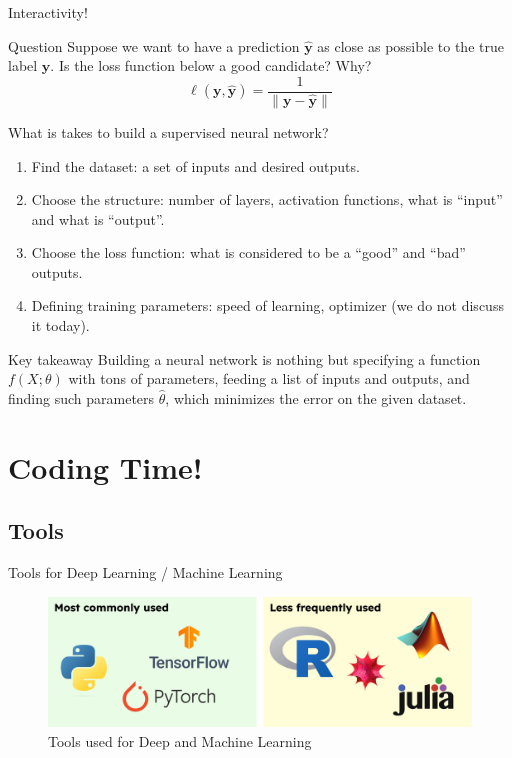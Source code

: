 \documentclass{beamer}
\begin{document}
    \begin{frame}{Interactivity!}
        \begin{block}{Question}
            Suppose we want to have a prediction $\hat{\boldsymbol{y}}$ as close as possible to the true label $\boldsymbol{y}$. Is the loss function below a good candidate? Why?
            \[
            \ell(\mathbf{y},\hat{\mathbf{y}}) = \frac{1}{\|\mathbf{y}-\hat{\mathbf{y}}\|}
            \]
        \end{block}
    \end{frame}

    \begin{frame}{What is takes to build a supervised neural network?}
        \begin{enumerate}
            \item Find the dataset: a set of inputs and desired outputs.
            \item Choose the structure: number of layers, activation functions, what is ``input'' and what is ``output''.
            \item Choose the loss function: what is considered to be a ``good'' and ``bad'' outputs.
            \item Defining training parameters: speed of learning, optimizer (we do not discuss it today).
        \end{enumerate}

        \begin{block}{Key takeaway}
            Building a neural network is nothing but specifying a function $f(X;\theta)$ with tons of parameters, feeding a list of inputs and outputs, and finding such parameters $\hat{\theta}$, which minimizes the error on the given dataset.
        \end{block}
    \end{frame}

    \section{Coding Time!}

    \subsection{Tools}

    \begin{frame}{Tools for Deep Learning / Machine Learning}
        \begin{figure}
        \centering
            \includegraphics[width=\textwidth]{images/presentation/tools.png}
            \caption{Tools used for Deep and Machine Learning}
        \end{figure}
    \end{frame}
\end{document}
